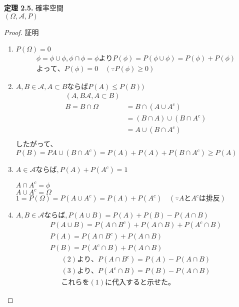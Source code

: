 \documentclass[dvipdfmx,10pt, a4j]{jarticle}
\theoremstyle{definition}
\begin{document}
    \noindent
    \textbf{定理 2.5.} 確率空間\\
    $(\Omega, \mathcal{A}, P)$\\
    \begin{proof} 証明\\
    \begin{enumerate}
        \renewcommand{\labelenumi}{\roman{enumi})}
        \item
        $P(\Omega) = 0$\\
        \begin{align*}
            \phi = \phi \cup \phi, \phi \cap \phi = \phi より
            P(\phi) = P(\phi \cup \phi) = P(\phi) + P(\phi)\\
            よって、 P(\phi) = 0 \quad (\because P(\phi) \geq 0)
        \end{align*}
        \item
        $A, B \in \mathcal{A}, A \subset B ならば P(A) \leq P(B))$
        \begin{align*}
            (A, B \mathcal{A}, A \subset B)\\
            B = B \cap \Omega &= B \cap (A \cup A^{c})\\
            &= (B \cap A) \cup (B \cap A^{c}) \\
            &= A \cup (B \cap A^{c}) \\
        \end{align*}
        したがって、 $P(B) = PA \cup (B \cap A^{c}) = P(A) + P(A) + P(B \cap A^{c}) \geq P(A)$
        \item
        $A \in \mathcal{A} ならば, P(A)+ P(A^{c}) = 1$
        \begin{center}
            $A \cap A^{c} = \phi$\\
            $A \cup A^{c} = \Omega$\\
            $1 = P(\Omega) = P(A \cup A^{c}) = P(A) + P(A^{c}) \quad (\because AとA^{c} は排反)$
        \end{center}
        \item
        $A, B \in \mathcal{A} ならば, P(A \cup B) = P(A) + P(B) - P(A \cap B)$
        \begin{align}
            P(A \cup B) = P(A \cap B^{c}) + P(A \cap B) + P(A^{c} \cap B)\\
            P(A) = P(A \cap B^{c}) + P(A \cap B)\\
            P(B) = P(A^{c} \cap B) + P(A \cap B)
        \end{align}
        \begin{align*}
            (2)より、 P(A \cap B^{c}) = P(A) - P(A \cap B)\\
            (3)より、 P(A^{c} \cap B) = P(B) - P(A \cap B)\\
            これらを (1) に代入すると示せた。
        \end{align*}
    \end{enumerate}
    \end{proof}
\end{document}
